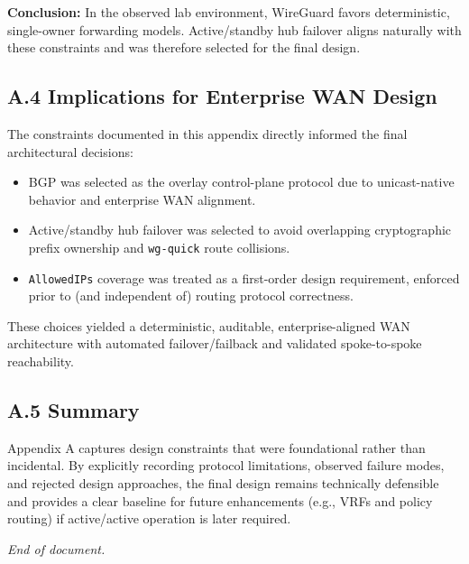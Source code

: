 \documentclass[11pt]{article}
\begin{document}
\textbf{Conclusion:} In the observed lab environment, WireGuard favors deterministic, single-owner forwarding models. Active/standby hub failover aligns naturally with these constraints and was therefore selected for the final design.

\subsection{A.4 Implications for Enterprise WAN Design}
\label{subsec:a4-enterprise-implications}

The constraints documented in this appendix directly informed the final architectural decisions:
\begin{itemize}
  \item BGP was selected as the overlay control-plane protocol due to unicast-native behavior and enterprise WAN alignment.
  \item Active/standby hub failover was selected to avoid overlapping cryptographic prefix ownership and \texttt{wg-quick} route collisions.
  \item \texttt{AllowedIPs} coverage was treated as a first-order design requirement, enforced prior to (and independent of) routing protocol correctness.
\end{itemize}

These choices yielded a deterministic, auditable, enterprise-aligned WAN architecture with automated failover/failback and validated spoke-to-spoke reachability.

\subsection{A.5 Summary}
\label{subsec:a5-summary}

Appendix A captures design constraints that were foundational rather than incidental. By explicitly recording protocol limitations, observed failure modes, and rejected design approaches, the final design remains technically defensible and provides a clear baseline for future enhancements (e.g., VRFs and policy routing) if active/active operation is later required.

\bigskip

\noindent\textit{End of document.}
\end{document}
